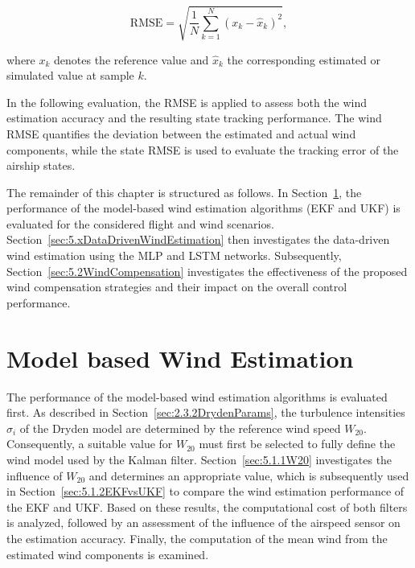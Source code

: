 \begin{equation}
	\mathrm{RMSE} =
	\sqrt{
		\frac{1}{N}
		\sum_{k=1}^{N}
		\left(x_k-\hat{x}_k\right)^2
	},
	\label{eq:rmse}
\end{equation}

where $x_k$ denotes the reference value and $\hat{x}_k$ the corresponding estimated or simulated value at sample $k$.

In the following evaluation, the RMSE is applied to assess both the wind estimation accuracy and the resulting state tracking performance. The wind RMSE quantifies the deviation between the estimated and actual wind components, while the state RMSE is used to evaluate the tracking error of the airship states. 

%

The remainder of this chapter is structured as follows. In Section~\ref{sec:5.1WindEstimation}, the performance of the model-based wind estimation algorithms (EKF and UKF) is evaluated for the considered flight and wind scenarios. Section~\ref{sec:5.xDataDrivenWindEstimation} then investigates the data-driven wind estimation using the MLP and LSTM networks. Subsequently, Section~\ref{sec:5.2WindCompensation} investigates the effectiveness of the proposed wind compensation strategies and their impact on the overall control performance.





\section{Model based Wind Estimation}
\label{sec:5.1WindEstimation}

The performance of the model-based wind estimation algorithms is evaluated first. As described in Section~\ref{sec:2.3.2DrydenParams}, the turbulence intensities $\sigma_i$ of the Dryden model are determined by the reference wind speed $W_{20}$. Consequently, a suitable value for $W_{20}$ must first be selected to fully define the wind model used by the Kalman filter. Section~\ref{sec:5.1.1W20} investigates the influence of $W_{20}$ and determines an appropriate value, which is subsequently used in Section~\ref{sec:5.1.2EKFvsUKF} to compare the wind estimation performance of the EKF and UKF. Based on these results, the computational cost of both filters is analyzed, followed by an assessment of the influence of the airspeed sensor on the estimation accuracy. Finally, the computation of the mean wind from the estimated wind components is examined.





